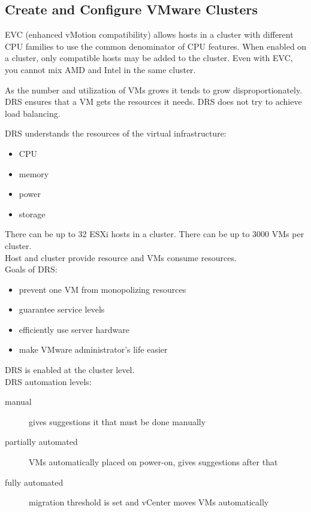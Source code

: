 \subsection{Create and Configure VMware Clusters}

EVC (enhanced vMotion compatibility) allows hosts in a cluster with different
CPU families to use the common denominator of CPU features. When enabled on a
cluster, only compatible hosts may be added to the cluster. Even with EVC,
you cannot mix AMD and Intel in the same cluster.

As the number and utilization of VMs grows it tends to grow disproportionately.
DRS ensures that a VM gets the resources it needs. DRS does not try to
achieve load balancing.

DRS understands the resources of the virtual infrastructure:

\begin{itemize}
\item CPU
\item memory
\item power
\item storage
\end{itemize}

There can be up to 32 ESXi hosts in a cluster. There can be up to 3000 VMs
per cluster.\\

Host and cluster provide resource and VMs consume resources.\\

Goals of DRS:

\begin{itemize}
\item prevent one VM from monopolizing resources
\item guarantee service levels
\item efficiently use server hardware
\item make VMware administrator's life easier
\end{itemize}

DRS is enabled at the cluster level.\\

DRS automation levels:

\begin{description}

\item[manual]
gives suggestions it that must be done manually

\item[partially automated]
VMs automatically placed on power-on, gives suggestions after that

\item[fully automated]
migration threshold is set and vCenter moves VMs automatically

\end{description}

